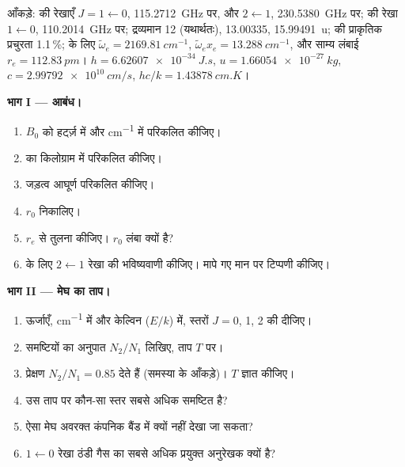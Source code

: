 \begin{problem}
\label{pb:b3:rovibrational-spectroscopy:1}
आँकड़े:  की रेखाएँ $J = 1 \leftarrow 0$, \qty{115.2712}{GHz} पर, और $2
\leftarrow 1$, \qty{230.5380}{GHz} पर;  की रेखा $1 \leftarrow 0$,
\qty{110.2014}{GHz} पर; द्रव्यमान  12 (यथार्थतः),  13.00335,
 \qty{15.99491}{u};  की प्राकृतिक प्रचुरता 1.1\,\%;  के लिए
$\tilde\omega_e = \qty{2169.81}{cm^{-1}}$, $\tilde\omega_ex_e = \qty{13.288}{cm^{-1}}$, और
साम्य लंबाई $r_e = \qty{112.83}{pm}$। $h = \qty{6.62607e-34}{J.s}$, $u =
\qty{1.66054e-27}{kg}$, $c = \qty{2.99792e10}{cm/s}$, $hc/k = \qty{1.43878}{cm.K}$।

\medskip\noindent\textbf{भाग I --- आबंध।}
\begin{enumerate}
  \item $B_0$ को हर्ट्ज़ में और \unit{cm^{-1}} में परिकलित कीजिए।
  \item {} का  किलोग्राम में परिकलित कीजिए।
  \item जड़त्व आघूर्ण परिकलित कीजिए।
  \item $r_0$ निकालिए।
  \item $r_e$ से तुलना कीजिए। $r_0$ लंबा क्यों है?
  \item {} के लिए $2 \leftarrow 1$ रेखा की भविष्यवाणी कीजिए। मापे गए
        मान पर टिप्पणी कीजिए।
\end{enumerate}

\medskip\noindent\textbf{भाग II --- मेघ का ताप।}
\begin{enumerate}[resume]
  \item ऊर्जाएँ, \unit{cm^{-1}} में और केल्विन ($E/k$) में, स्तरों $J =
        0$, 1, 2 की दीजिए।
  \item समष्टियों का अनुपात $N_2/N_1$ लिखिए, ताप $T$ पर।
  \item प्रेक्षण $N_2/N_1 = 0.85$ देते हैं (समस्या के आँकड़े)। $T$ ज्ञात कीजिए।
  \item उस ताप पर कौन-सा स्तर सबसे अधिक समष्टित है?
  \item ऐसा मेघ अवरक्त कंपनिक बैंड में क्यों नहीं देखा जा सकता?
  \item $1 \leftarrow 0$ रेखा ठंडी गैस का सबसे अधिक प्रयुक्त अनुरेखक क्यों है?
\end{enumerate}


\end{problem}
